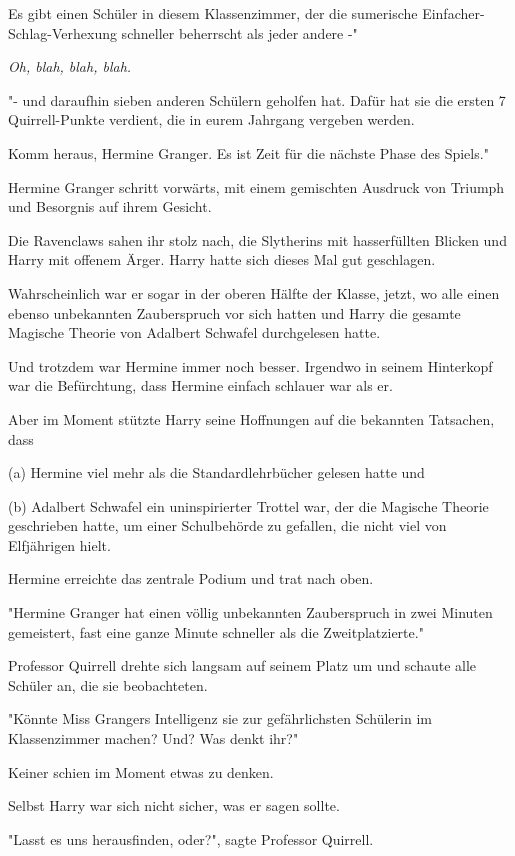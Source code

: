 {Es gibt einen Schüler in diesem Klassenzimmer, der die sumerische Einfacher-Schlag-Verhexung schneller beherrscht als jeder andere -"

\emph{Oh, blah, blah, blah.}

"- und daraufhin sieben anderen Schülern geholfen hat. Dafür hat sie die ersten 7 Quirrell-Punkte verdient, die in eurem Jahrgang vergeben werden.

Komm heraus, Hermine Granger. Es ist Zeit für die nächste Phase des Spiels."

Hermine Granger schritt vorwärts, mit einem gemischten Ausdruck von Triumph und Besorgnis auf ihrem Gesicht.

Die Ravenclaws sahen ihr stolz nach, die Slytherins mit hasserfüllten Blicken und Harry mit offenem Ärger. Harry hatte sich dieses Mal gut geschlagen.

Wahrscheinlich war er sogar in der oberen Hälfte der Klasse, jetzt, wo alle einen ebenso unbekannten Zauberspruch vor sich hatten und Harry die gesamte Magische Theorie von Adalbert Schwafel durchgelesen hatte.

Und trotzdem war Hermine immer noch besser. Irgendwo in seinem Hinterkopf war die Befürchtung, dass Hermine einfach schlauer war als er.

Aber im Moment stützte Harry seine Hoffnungen auf die bekannten Tatsachen, dass

(a) Hermine viel mehr als die Standardlehrbücher gelesen hatte und

(b) Adalbert Schwafel ein uninspirierter Trottel war, der die Magische Theorie geschrieben hatte, um einer Schulbehörde zu gefallen, die nicht viel von Elfjährigen hielt.

Hermine erreichte das zentrale Podium und trat nach oben.

"Hermine Granger hat einen völlig unbekannten Zauberspruch in zwei Minuten gemeistert, fast eine ganze Minute schneller als die Zweitplatzierte."

Professor Quirrell drehte sich langsam auf seinem Platz um und schaute alle Schüler an, die sie beobachteten.

"Könnte Miss Grangers Intelligenz sie zur gefährlichsten Schülerin im Klassenzimmer machen? Und? Was denkt ihr?"

Keiner schien im Moment etwas zu denken.

Selbst Harry war sich nicht sicher, was er sagen sollte.

"Lasst es uns herausfinden, oder?", sagte Professor Quirrell.

}
